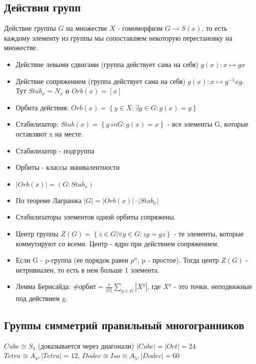 \documentclass[11pt,a4paper]{article}
\begin{document}
		\subsection*{ Действия групп} Действие группы $G$ на множестве $X$ - гомоморфизм $G \rightarrow S(x)$, то есть каждому элементу из группы мы сопоставляем некоторую перестановку на множестве. 
		\begin{itemize}
		\item Действие левыми сдвигами (группа действует сама на себя) $g(x): x \mapsto gx$
		\item Действие сопряжением (группа действует сама на себя) $g(x): x \mapsto g^{-1}xg$. Тут $Stab_x = N_x$ и $Orb(x) = \left[x\right] $
		\item Орбита действия: $Orb(x) = \left\{y \in X: \exists g \in G: g(x) = y\right\}$
		\item Стабилизатор: $Stab(x) = \left\{g \ in G: g(x) = x\right\}$ - все элементы G, которые оставляют x на месте. 
		\item Стабилизатор - подгруппа
		\item Орбиты - классы эквивалентности
		\item $|Orb(x)| = (G : Stab_x)$
		\item По теореме Лагранжа $|G| = |Orb(x)| \cdot |Stab_x|$
		
		\item Стабилизаторы элементов одной орбиты сопряжены.
		
		\item Центр группы $Z(G) = \left\{z \in G| \forall g \in G: zg = gz\right\}$ - те элементы, которые коммутируют со всеми. Центр - ядро при действием сопряжением.
		
		\item Если G - p-группа (ее порядок равен $p^n$, p - простое). Тогда центр $Z(G)$ - нетривиален, то есть в нем больше 1 элемента. 			
		
		\item Лемма Бернсайда: $\#\text{орбит} = \frac{1}{|G|}\sum_{g \in G} |X^g|$, где $X^g $ - это точки, неподвижные под действием g. 
		\end{itemize}
		
		
		\subsection*{Группы симметрий правильный многогранников} 
		$Cube \cong S_4$ (доказывается через диагонали) $|Cube| = |Oct| = 24$\\
		$Tetra \cong A_4, |Tetra| = 12$, $Dodec \cong Iso \cong A_5,  |Dodec| = 60$\\
		
\end{document}
